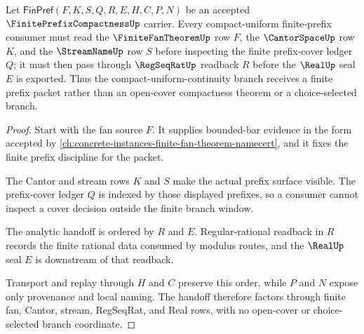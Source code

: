 \begin{theorem}\label{thm:finite-prefix-compactness-fan-handoff}
Let $\mathsf{FinPref}(F,K,S,Q,R,E,H,C,P,N)$ be an accepted $\FinitePrefixCompactnessUp$ carrier. Every compact-uniform finite-prefix consumer must read the $\FiniteFanTheoremUp$ row $F$, the $\CantorSpaceUp$ row $K$, and the $\StreamNameUp$ row $S$ before inspecting the finite prefix-cover ledger $Q$; it must then pass through $\RegSeqRatUp$ readback $R$ before the $\RealUp$ seal $E$ is exported. Thus the compact-uniform-continuity branch receives a finite prefix packet rather than an open-cover compactness theorem or a choice-selected branch.
\end{theorem}
\begin{proof}
Start with the fan source $F$. It supplies bounded-bar evidence in the form accepted by \autoref{ch:concrete-instances-finite-fan-theorem-namecert}, and it fixes the finite prefix discipline for the packet.

The Cantor and stream rows $K$ and $S$ make the actual prefix surface visible. The prefix-cover ledger $Q$ is indexed by those displayed prefixes, so a consumer cannot inspect a cover decision outside the finite branch window.

The analytic handoff is ordered by $R$ and $E$. Regular-rational readback in $R$ records the finite rational data consumed by modulus routes, and the $\RealUp$ seal $E$ is downstream of that readback.

Transport and replay through $H$ and $C$ preserve this order, while $P$ and $N$ expose only provenance and local naming. The handoff therefore factors through finite fan, Cantor, stream, RegSeqRat, and Real rows, with no open-cover or choice-selected branch coordinate.
\end{proof}


\begin{closurestatus}{\FinitePrefixCompactnessUp}
  \theoryclosure{\seedClosure}
  \formalstatus{\unformalizedV}
\end{closurestatus}

